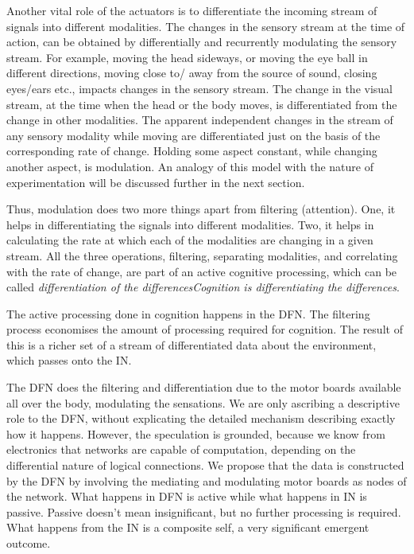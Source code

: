 Another vital role of the actuators is to differentiate the incoming stream of signals into different modalities. The changes in the sensory stream at the time of action, can be obtained by differentially and recurrently modulating the sensory stream.
For example, moving the head sideways, or moving the eye ball in different directions, moving close to/ away from the source of sound, closing eyes/ears etc., impacts changes in the sensory stream. The change in the visual stream, at the time when the head or the body moves, is differentiated from the change in other modalities. The apparent independent changes in the stream of any sensory modality while moving are differentiated just on the basis of the corresponding rate of change. Holding some aspect constant, while changing another aspect, is modulation. An analogy of this model with the nature of experimentation will be discussed further in the next section.

Thus, modulation does two more things apart from filtering (attention). One, it helps in differentiating the signals into different modalities. Two, it helps in calculating the rate at which each of the modalities are changing in a given stream. All the three operations, filtering, separating modalities, and correlating with the rate of change, are part of an active cognitive processing, which can be called \textit{differentiation of the differences}\emph{Cognition is differentiating the differences}.

The active processing done in cognition happens in the DFN. The filtering process economises the amount of processing required for cognition. The result of this is a richer set of a stream of differentiated data about the environment, which passes onto the IN.

The DFN does the filtering and differentiation due to the motor boards available all over the body, modulating the sensations. We are only ascribing a descriptive role to the DFN, without explicating the detailed mechanism describing exactly how it happens. However, the speculation is grounded, because we know from electronics that networks are capable of computation, depending on the differential nature of logical connections.  We propose that the data is constructed by the DFN by involving the mediating and modulating motor boards as nodes of the network. What happens in DFN is active while what happens in IN is passive. Passive doesn't mean insignificant, but no further processing is required. What happens from the IN is a composite self, a very significant emergent outcome. 

